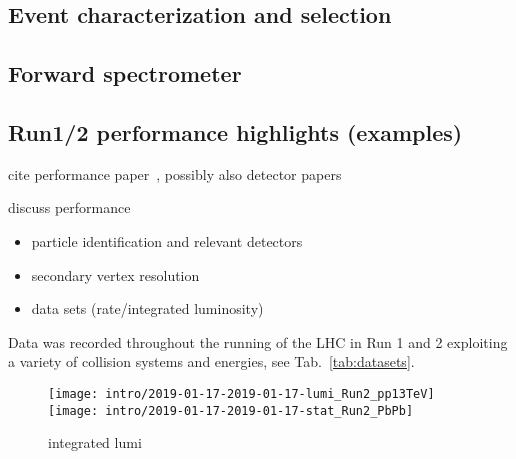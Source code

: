\subsection{Event characterization and selection}

\subsection{Forward spectrometer}

\subsection*{Run1/2 performance highlights (examples)}

cite performance paper~\cite{Abelev:2014ffa}, possibly also detector papers

discuss performance
\begin{itemize}
\item particle identification and relevant detectors
\item secondary vertex resolution
\item data sets (rate/integrated luminosity)
\end{itemize}

Data was recorded throughout the
running of the LHC in Run 1 and 2 exploiting a variety of collision systems and
energies, see Tab.~\ref{tab:datasets}.

\begin{figure}
\centering
\texttt{[image: intro/2019-01-17-2019-01-17-lumi\_Run2\_pp13TeV]}
\texttt{[image: intro/2019-01-17-2019-01-17-stat\_Run2\_PbPb]}
\caption{integrated lumi}
\label{fig:lumi_run2}
\end{figure}

